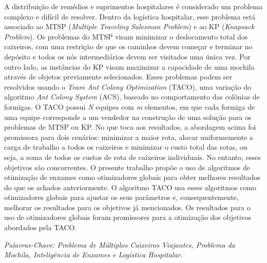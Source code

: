 \setlength{\absparsep}{18pt} %
\begin{resumo}
  A distribuição de remédios e suprimentos hospitalares é considerado um problema complexo e difícil de resolver. Dentro da logística hospitalar, esse problema está associado ao MTSP (\textit{Multiple Traveling Salesman Problem}) e ao KP (\textit{Knapsack Problem}). Os problemas do MTSP visam minimizar o deslocamento total dos caixeiros, com uma restrição de que os caminhos devem começar e terminar no depósito e todos os nós intermediários devem ser visitados uma única vez. Por outro lado, as instâncias do KP visam maximizar a capacidade de uma mochila através de objetos previamente selecionados. Esses problemas podem ser resolvidos usando o \textit{Team Ant Colony Optimization} (TACO), uma variação do algoritmo \textit{Ant Colony System} (ACS), baseado no comportamento das colônias de formigas. O TACO possui \textit{N} equipes com \textit{m} elementos, em que cada formiga de uma equipe corresponde a um vendedor na construção de uma solução para os problemas de MTSP ou KP. No que toca aos resultados, a abordagem acima foi promissora para dois cenários: minimizar a maior rota, alocar uniformemente a carga de trabalho a todos os caixeiros e minimizar o custo total das rotas, ou seja, a soma de todos os custos de rota de caixeiros individuais. No entanto, esses objetivos são concorrentes. O presente trabalho propõe o uso de algoritmos de otimização de enxames como otimizadores globais para obter melhores resultados do que os achados anteriormente. O algoritmo TACO usa esses algoritmos como otimizadores globais para ajustar os seus parâmetros e, consequentemente, melhorar os resultados para os objetivos já mencionados. Os resultados para o uso de otimizadores globais foram promissores para a otimização dos objetivos abordados pela TACO.

  \textit{Palavras-Chave: Problema de Múltiplos Caixeiros Viajantes, Problema da Mochila, Inteligência de Enxames e Logística Hospitalar.}

\end{resumo}

